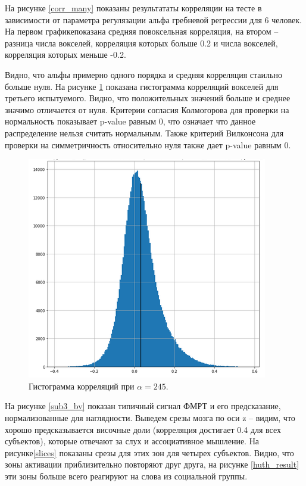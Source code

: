 \documentclass[pdftex,ptm,12pt,a4paper]{report}
\theoremstyle{definition}
\begin{document}
На рисунке \ref{corr_many} показаны результататы корреляции на тесте в зависимости от параметра регулязации альфа гребневой регрессии для 6 человек. На первом графикепоказана средняя повоксельная корреляция, на втором -- разница числа вокселей, корреляция которых больше 0.2 и числа вокселей, корреляция которых меньше -0.2.

Видно, что альфы примерно одного порядка и средняя корреляция стаильно больше нуля. На рисунке \ref{sub3_hist} показана гистограмма корреляций вокселей для третьего испытуемого. Видно, что положительных значений больше и среднее значимо отличается от нуля. Критерии согласия Колмогорова для проверки на нормальность показывает p-value равным 0, что означает что данное распределение нельзя считать нормальным. Также критерий Вилконсона для проверки на симметричность относительно нуля также дает p-value равным 0.

\begin{figure}[h]
\includegraphics[scale=0.6]{graphics/sub3_prep2.png}
\centering
\caption{Гистограмма корреляций при $\alpha=245$.}
\label{sub3_hist}
\end{figure}

На рисунке \ref{sub3_bv} показан типичный сигнал ФМРТ и его предсказание, нормализованные для наглядности. Выведем срезы мозга  по оси z -- видим, что хорошо предсказывается височные доли (корреляция достигает 0.4 для всех субъектов), которые отвечают за слух и ассоциативное мышление. На рисунке\ref{slices} показаны срезы для этих зон для четырех субъектов. Видно, что зоны активации приблизительно повторяют друг друга, на рисунке \ref{huth_result} эти зоны больше всего реагируют на слова из социальной группы. 
\end{document}
